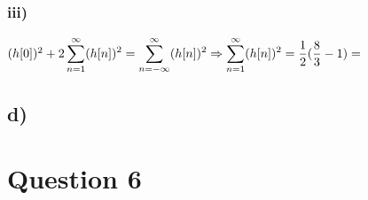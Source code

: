 \documentclass[12pt]{article}
\begin{document}
    \subsubsection*{iii)}
    \begin{math}
    (h[0])^{2} + 2 \displaystyle\sum_{n=1}^{\infty} (h[n])^{2} = \displaystyle\sum_{n=-\infty}^{\infty} (h[n])^{2} \\
    \Rightarrow \displaystyle\sum_{n=1}^{\infty} (h[n])^{2} = \frac{1}{2} (\frac{8}{3} - 1) = 
    \end{math}
    \subsection*{d)}
    \section*{Question 6}
\end{document}
